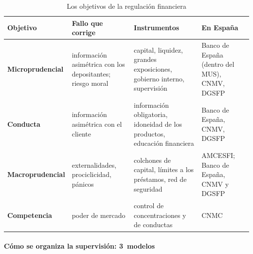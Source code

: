 \documentclass[11pt]{article}
\begin{document}
\begin{table}[H]
\centering
\caption{Los objetivos de la regulación financiera}\label{tab:objetivos}
\small
\begin{tabular}{>{\raggedright\arraybackslash}m{2.7cm}|>{\raggedright\arraybackslash}m{3.4cm}|>{\raggedright\arraybackslash}m{4.4cm}|>{\raggedright\arraybackslash}m{3.6cm}}
\rowcolor{tceeazulpalido}\textbf{Objetivo} & \textbf{Fallo que corrige} & \textbf{Instrumentos} & \textbf{En España}\\ \hline
\textbf{\textcolor{tceemorado}{Microprudencial}} & información asimétrica con los depositantes; riesgo moral & capital, liquidez, grandes exposiciones, gobierno interno, supervisión & Banco de España (dentro del MUS), CNMV, DGSFP\\ \hline
\textbf{\textcolor{tceeazul}{Conducta}} & información asimétrica con el cliente & información obligatoria, idoneidad de los productos, educación financiera & Banco de España, CNMV, DGSFP\\ \hline
\textbf{\textcolor{tceerojo}{Macroprudencial}} & externalidades, prociclicidad, pánicos & colchones de capital, límites a los préstamos, red de seguridad & AMCESFI; Banco de España, CNMV y DGSFP\\ \hline
\textbf{\textcolor{tceeverde}{Competencia}} & poder de mercado & control de concentraciones y de conductas & CNMC\\
\end{tabular}
\end{table}

\paragraph{Cómo se organiza la supervisión: 3~modelos}
\end{document}
